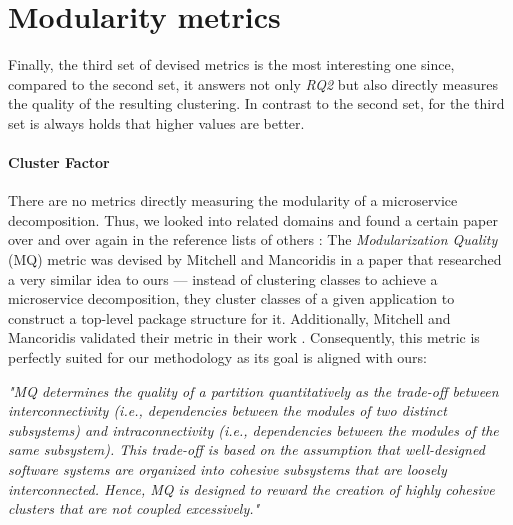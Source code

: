 \documentclass[12pt,a4paper]{report}
\begin{document}
\section{Modularity metrics}

Finally, the third set of devised metrics is the most interesting one since,
compared to the second set, it answers not only \textit{RQ2} but also directly
measures the quality of the resulting clustering. In contrast to the second
set, for the third set is always holds that higher values are better.

\paragraph{Cluster Factor}
There are no metrics directly measuring the modularity of a microservice
decomposition. Thus, we looked into related domains and found a certain paper
over and over again in the reference lists of others \cite{
maqbool2007hierarchical, praditwong2010software, tsantalis2009identification,
jiang2006visualizing}: The \textit{Modularization Quality} (MQ) metric was
devised by Mitchell and Mancoridis \cite{mitchell2006automatic} in a paper that
researched a very similar idea to ours --- instead of clustering classes to
achieve a microservice decomposition, they cluster classes of a given
application to construct a top\hyp level package structure for it.
Additionally, Mitchell and Mancoridis validated their metric in their work
\cite{mitchell2006automatic}. Consequently, this metric is perfectly suited for
our methodology as its goal is aligned with ours:
\begin{displayquote}
  \emph{
  "MQ determines the quality of a partition quantitatively as the trade-off
  between interconnectivity (i.e., dependencies between the modules of two
  distinct subsystems) and intraconnectivity (i.e., dependencies between the
  modules of the same subsystem). This trade-off is based on the assumption that
  well-designed software systems are organized into cohesive subsystems that are
  loosely interconnected. Hence, MQ is designed to reward the creation of highly
  cohesive clusters that are not coupled excessively."
  }~\cite{mitchell2006automatic}
\end{displayquote}
\end{document}
